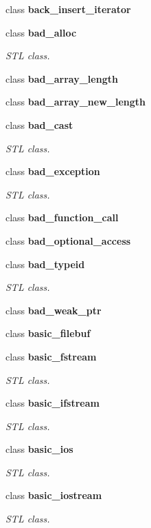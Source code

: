 \begin{DoxyCompactItemize}
class \textbf{ back\+\_\+insert\+\_\+iterator}
\item 
class \textbf{ bad\+\_\+alloc}
\begin{DoxyCompactList}\small\item\em S\+TL class. \end{DoxyCompactList}\item 
class \textbf{ bad\+\_\+array\+\_\+length}
\item 
class \textbf{ bad\+\_\+array\+\_\+new\+\_\+length}
\item 
class \textbf{ bad\+\_\+cast}
\begin{DoxyCompactList}\small\item\em S\+TL class. \end{DoxyCompactList}\item 
class \textbf{ bad\+\_\+exception}
\begin{DoxyCompactList}\small\item\em S\+TL class. \end{DoxyCompactList}\item 
class \textbf{ bad\+\_\+function\+\_\+call}
\item 
class \textbf{ bad\+\_\+optional\+\_\+access}
\item 
class \textbf{ bad\+\_\+typeid}
\begin{DoxyCompactList}\small\item\em S\+TL class. \end{DoxyCompactList}\item 
class \textbf{ bad\+\_\+weak\+\_\+ptr}
\item 
class \textbf{ basic\+\_\+filebuf}
\item 
class \textbf{ basic\+\_\+fstream}
\begin{DoxyCompactList}\small\item\em S\+TL class. \end{DoxyCompactList}\item 
class \textbf{ basic\+\_\+ifstream}
\begin{DoxyCompactList}\small\item\em S\+TL class. \end{DoxyCompactList}\item 
class \textbf{ basic\+\_\+ios}
\begin{DoxyCompactList}\small\item\em S\+TL class. \end{DoxyCompactList}\item 
class \textbf{ basic\+\_\+iostream}
\begin{DoxyCompactList}\small\item\em S\+TL class. \end{DoxyCompactList}\item 

\end{DoxyCompactItemize}

